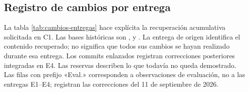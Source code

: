 \subsection{Registro de cambios por entrega}
La tabla \ref{tab:cambios-entregas} hace explícita la recuperación acumulativa solicitada en C1. Las bases históricas son ,  y . La entrega de origen identifica el contenido recuperado; no significa que todos sus cambios se hayan realizado durante esa entrega. Los commits enlazados registran correcciones posteriores integradas en E4. Las reservas describen lo que todavía no queda demostrado. Las filas con prefijo «Eval.» corresponden a observaciones de evaluación, no a las entregas E1--E4; registran las correcciones del 11 de septiembre de 2026.

